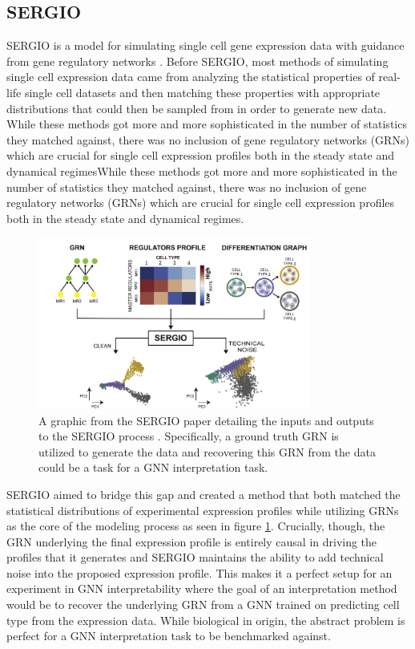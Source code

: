 \subsection{SERGIO}
SERGIO is a model for simulating single cell gene expression data with guidance from gene regulatory networks \cite{dibaeinia_sergio_2020}. Before SERGIO, most methods of simulating single cell expression data came from analyzing the statistical properties of real-life single cell datasets and then matching these properties with appropriate distributions that could then be sampled from in order to generate new data. While these methods got more and more sophisticated in the number of statistics they matched against, there was no inclusion of gene regulatory networks (GRNs) which are crucial for single cell expression profiles both in the steady state and dynamical regimesWhile these methods got more and more sophisticated in the number of statistics they matched against, there was no inclusion of gene regulatory networks (GRNs) which are crucial for single cell expression profiles both in the steady state and dynamical regimes.
\begin{figure}[t]
	\centering
	\includegraphics[width=0.8\textwidth]{images/sergio.png}
	\caption{A graphic from the SERGIO paper detailing the inputs and outputs to the SERGIO process \cite{dibaeinia_sergio_2020}. Specifically, a ground truth GRN is utilized to generate the data and recovering this GRN from the data could be a task for a GNN interpretation task.}
	\label{fig:sergio}
\end{figure}

SERGIO aimed to bridge this gap and created a method that both matched the statistical distributions of experimental expression profiles while utilizing GRNs as the core of the modeling process as seen in figure \ref{fig:sergio}. Crucially, though, the GRN underlying the final expression profile is entirely causal in driving the profiles that it generates and SERGIO maintains the ability to add technical noise into the proposed expression profile. This makes it a perfect setup for an experiment in GNN interpretability where the goal of an interpretation method would be to recover the underlying GRN from a GNN trained on predicting cell type from the expression data. While biological in origin, the abstract problem is perfect for a GNN interpretation task to be benchmarked against.

